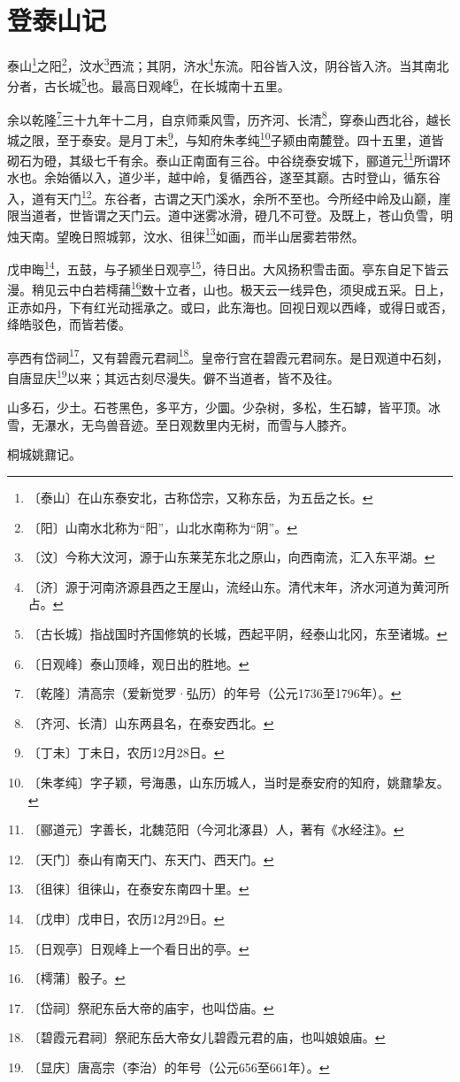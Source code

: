 \documentclass[12pt,UTF-8,openany,a4]{ctexbook}
\begin{document}
\chapter{登泰山记}

\begin{large}
    
    泰山\footnote{〔泰山〕\yiwen 在山东泰安北，古称岱宗，又称东岳，为五岳之长。}之阳\footnote{〔阳〕\yiwen 山南水北称为“阳”，山北水南称为“阴”。}，汶水\footnote{〔汶〕\yiwen \yiwen 今称大汶河，源于山东莱芜东北之原山，向西南流，汇入东平湖。}西流；其阴，济水\footnote{〔济〕\yiwen 源于河南济源县西之王屋山，流经山东。清代末年，济水河道为黄河所占。}东流。阳谷皆入汶，阴谷皆入济。当其南北分者，古长城\footnote{〔古长城〕\yiwen 指战国时齐国修筑的长城，西起平阴，经泰山北冈，东至诸城。}也。最高日观峰\footnote{〔日观峰〕\yiwen 泰山顶峰，观日出的胜地。}，在长城南十五里。
    
    余以乾隆\footnote{〔乾隆〕\yiwen 清高宗（爱新觉罗·弘历）的年号（公元1736至1796年）。}三十九年十二月，自京师乘风雪，历齐河、长清\footnote{〔齐河、长清〕\yiwen 山东两县名，在泰安西北。}，穿泰山西北谷，越长城之限，至于泰安。是月丁未\footnote{〔丁未〕\yiwen 丁未日，农历12月28日。}，与知府朱孝纯\footnote{〔朱孝纯〕\yiwen 字子颖，号海愚，山东历城人，当时是泰安府的知府，姚鼐挚友。}子颍由南麓登。四十五里，道皆砌石为磴，其级七千有余。泰山正南面有三谷。中谷绕泰安城下，郦道元\footnote{〔郦道元〕\yiwen 字善长，北魏范阳（今河北涿县）人，著有《水经注》。}所谓环水也。余始循以入，道少半，越中岭，复循西谷，遂至其巅。古时登山，循东谷入，道有天门\footnote{〔天门〕\yiwen 泰山有南天门、东天门、西天门。}。东谷者，古谓之天门溪水，余所不至也。今所经中岭及山巅，崖限当道者，世皆谓之天门云。道中迷雾冰滑，磴几不可登。及既上，苍山负雪，明烛天南。望晚日照城郭，汶水、徂徕\footnote{〔徂徕〕\yiwen 徂徕山，在泰安东南四十里。}如画，而半山居雾若带然。
    
    戊申晦\footnote{〔戊申〕\yiwen 戊申日，农历12月29日。}，五鼓，与子颍坐日观亭\footnote{〔日观亭〕\yiwen 日观峰上一个看日出的亭。}，待日出。大风扬积雪击面。亭东自足下皆云漫。稍见云中白若樗蒱\footnote{〔樗蒲〕\yiwen 骰子。}数十立者，山也。极天云一线异色，须臾成五采。日上，正赤如丹，下有红光动摇承之。或曰，此东海也。回视日观以西峰，或得日或否，绛皓驳色，而皆若偻。
    
    亭西有岱祠\footnote{〔岱祠〕\yiwen 祭祀东岳大帝的庙宇，也叫岱庙。}，又有碧霞元君祠\footnote{〔碧霞元君祠〕\yiwen 祭祀东岳大帝女儿碧霞元君的庙，也叫娘娘庙。}。皇帝行宫在碧霞元君祠东。是日观道中石刻，自唐显庆\footnote{〔显庆〕\yiwen 唐高宗（李治）的年号（公元656至661年）。}以来；其远古刻尽漫失。僻不当道者，皆不及往。
    
    山多石，少土。石苍黑色，多平方，少圜。少杂树，多松，生石罅，皆平顶。冰雪，无瀑水，无鸟兽音迹。至日观数里内无树，而雪与人膝齐。
    
    桐城姚鼐记。

\end{large}
\end{document}

